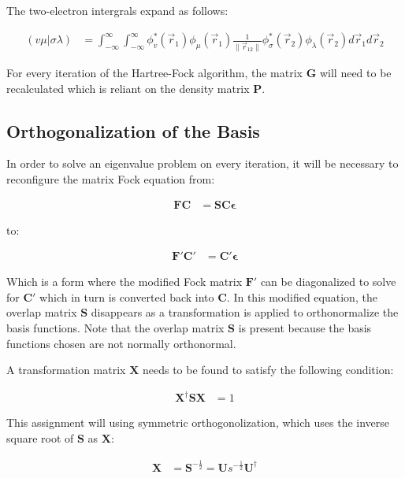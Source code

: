 \documentclass[10pt, oneside, letterpaper]{article}
\begin{document}
The two-electron intergrals expand as follows:

\begin{align*}
  (v\mu|\sigma\lambda) &= \int_{-\infty}^{\infty}\int_{-\infty}^{\infty}  \phi_v^\ast(\vec{r}_1)\phi_\mu(\vec{r}_1) \frac{1}{\|\vec{r}_{12}\|}  \phi_\sigma^\ast(\vec{r}_2)\phi_\lambda(\vec{r}_2)  d\vec{r}_1d\vec{r}_2
\end{align*}

For every iteration of the Hartree-Fock algorithm, the matrix $\bm{G}$ will need to be recalculated which is reliant on the density matrix $\bm{P}$.

\subsection{Orthogonalization of the Basis}

In order to solve an eigenvalue problem on every iteration, it will be necessary to reconfigure the matrix Fock equation from:

\begin{align*}
\bm{F}\bm{C} &= \bm{S}\bm{C}\bm{\epsilon}
\end{align*}

to:

\begin{align*}
\bm{F}'\bm{C}' &= \bm{C}'\bm{\epsilon}
\end{align*}

Which is a form where the modified Fock matrix $\bm{F}'$ can be diagonalized to solve for $\bm{C}'$ which in turn is converted back into $\bm{C}$. In this modified equation, the overlap matrix $\bm{S}$ disappears as a transformation is applied to orthonormalize the basis functions. Note that the overlap matrix $\bm{S}$ is present because the basis functions chosen are not normally orthonormal.

A transformation matrix $\bm{X}$ needs to be found to satisfy the following condition:

\begin{align*}
\bm{X}^\dagger\bm{S}\bm{X} &= 1
\end{align*}

This assignment will using symmetric orthogonolization, which uses the inverse square root of $\bm{S}$ as $\bm{X}$:

\begin{align*}
\bm{X} &= \bm{S}^{-\frac{1}{2}} = \bm{U}s^{-\frac{1}{2}}\bm{U}^\dagger
\end{align*}
\end{document}
